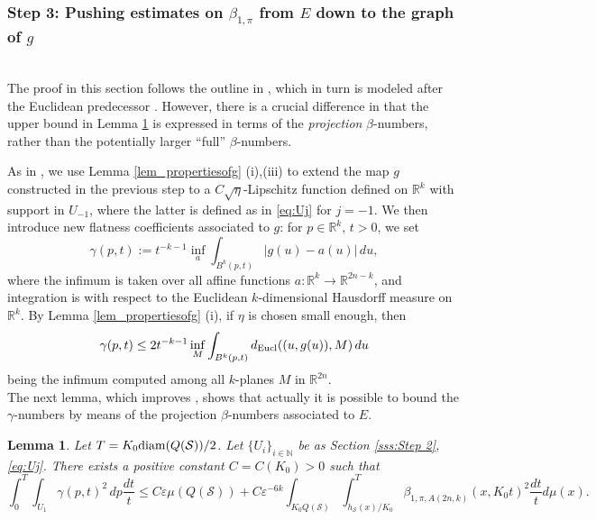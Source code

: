 \documentclass[12pt]{amsart}
\newcommand{\R}{\mathbb R}
\newcommand{\diam}{{\rm diam}}
\newcommand{\N}{\mathbb N}
\numberwithin{equation}{section}
\theoremstyle{plain}
\newtheorem{lemma}[theorem]{Lemma}
\theoremstyle{definition}
\theoremstyle{remark}
\begin{document}
\subsubsection{Step 3: 
Pushing estimates on $\beta_{1,\pi}$ from $E$ down to the graph of $g$
}\label{ss:Step3}\phantom{}\vspace{0.1cm}\\
The proof in this section follows the outline in \cite[Section 6]{Hahlomaa}, which in turn is modeled after the Euclidean predecessor \cite[Section 13]{David1}. However, there is a crucial difference in that the upper bound in Lemma \ref{l:HLem6.1} is expressed in terms of the \emph{projection} $\beta$-numbers, rather than the potentially larger ``full'' $\beta$-numbers.

As in \cite[Section 6]{Hahlomaa}, we use Lemma \ref{lem_propertiesofg} (i),(iii) to extend the map $g$ constructed in the previous step to a $C\sqrt\eta$-Lipschitz function defined on $\R^k$ with support in $U_{-1}$, where the latter is defined as in \eqref{eq:Uj} for $j=-1$. We then introduce new flatness coefficients associated to $g$: for $p\in\R^k,\, t>0$, we set
\[\gamma(p,t):=t^{-k-1}\inf_a\int_{B^k(p,t)}|g(u)-a(u)|\,du,\]
where the infimum is taken over all affine functions $a:\R^k\to\R^{2n-k}$, and integration is with respect to the Euclidean $k$-dimensional Hausdorff measure on $\mathbb{R}^k$. By Lemma \ref{lem_propertiesofg} (i), if $\eta$ is chosen small enough, then 
\begin{equation}\label{estimateforgamma}
\gamma(p,t)\leq 2t^{-k-1}\inf_M\int_{B^k(p,t)}d_{\rm Eucl}((u,g(u)),M)\,du
\end{equation}
being the infimum computed among all $k$-planes $M$ in $\R^{2n}$.\medskip\\
The next lemma, which improves \cite[Lemma 6.1]{Hahlomaa}, shows that actually it is possible to bound the $\gamma$-numbers by means of the projection $\beta$-numbers associated to $E$.
\begin{lemma}\label{l:HLem6.1}
    Let $T=K_0 \diam (Q(\mathcal{S}))/2$. Let $\{U_i\}_{i\in \N}$ be as Section \ref{sss:Step 2}, \eqref{eq:Uj}.
    There exists a positive constant $C=C(K_0)>0$ such that
\begin{equation}\label{eq_step3}
\int_0^T \int_{U_1} \gamma(p,t)^2\, dp\frac{dt}{t}\leq C\varepsilon \mu(Q(\mathcal{S})) + C\varepsilon^{-6k}\int_{K_0 Q(\mathcal{S})}\int_{h_{\mathcal{S}}(x)/K_0}^T \beta_{1,\pi,A(2n,k)}(x, K_0 t)^2 \frac{dt}{t}d\mu(x).
\end{equation}
\end{lemma}
\end{document}
